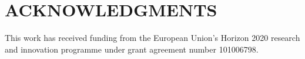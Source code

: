 \section*{\uppercase{Acknowledgments}}\label{sec:acknowledgments}

\noindent This work has received funding from the European Union’s Horizon 2020 research and innovation programme under grant agreement number 101006798.
